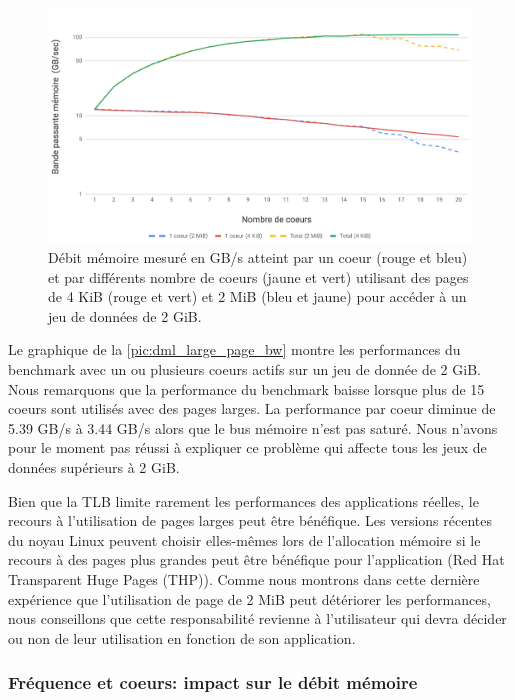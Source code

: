     \begin{figure}
    \center
    \includegraphics[width=14cm]{images/dml_large_page_bw.png}
    \caption{\label{pic:dml_large_page_bw} Débit mémoire mesuré en GB/s atteint par un coeur (rouge et bleu) et par différents nombre de coeurs (jaune et vert) utilisant des pages de 4 KiB (rouge et vert) et 2 MiB (bleu et jaune) pour accéder à un jeu de données de 2 GiB.}
    \end{figure}
    
    Le graphique de la \autoref{pic:dml_large_page_bw} montre les performances du benchmark avec un ou plusieurs coeurs actifs sur un jeu de donnée de 2 GiB. Nous remarquons que la performance du benchmark baisse lorsque plus de 15 coeurs sont utilisés avec des pages larges. La performance par coeur diminue de 5.39 GB/s à 3.44 GB/s alors que le bus mémoire n'est pas saturé. Nous n'avons pour le moment pas réussi à expliquer ce problème qui affecte tous les jeux de données supérieurs à 2 GiB.
    
    Bien que la TLB limite rarement les performances des applications réelles, le recours à l'utilisation de pages larges peut être bénéfique. Les versions récentes du noyau Linux peuvent choisir elles-mêmes lors de l'allocation mémoire si le recours à des pages plus grandes peut être bénéfique pour l'application (Red Hat Transparent Huge Pages (THP)). Comme nous montrons dans cette dernière expérience que l'utilisation de page de 2 MiB peut détériorer les performances, nous conseillons que cette responsabilité revienne à l'utilisateur qui devra décider ou non de leur utilisation en fonction de son application. 
  


    
    \subsubsection{Fréquence et coeurs: impact sur le débit mémoire} \label{sec:dml_core_vs_freq}
    
